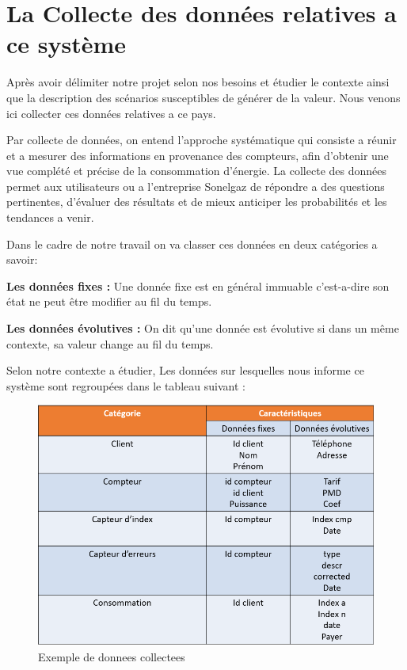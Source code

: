 \section{La Collecte des données relatives a ce système}

Après avoir délimiter notre projet selon nos besoins et étudier le contexte ainsi que la description des scénarios susceptibles de générer de la valeur. Nous venons ici collecter ces données relatives a ce pays.

Par collecte de données, on entend l'approche systématique qui consiste a réunir et a mesurer des informations en provenance des compteurs, afin d'obtenir une vue complété et précise de la consommation d'énergie. La collecte des données permet aux utilisateurs ou a l'entreprise Sonelgaz de répondre a des questions pertinentes, d'évaluer des résultats et de mieux anticiper les probabilités et les tendances a venir. 

Dans le cadre de notre travail on va classer ces données en deux catégories a savoir:

\textbf{Les données fixes :} Une donnée fixe est en général immuable c'est-a-dire son état ne peut être modifier au fil du temps.

\textbf{Les données évolutives :} On dit qu'une donnée est évolutive si dans un même
contexte, sa valeur change au fil du temps.

Selon notre contexte a étudier, Les données sur lesquelles nous informe ce système sont regroupées dans le tableau suivant :

\begin{figure}[h]
	\centering
	\includegraphics[scale=0.8]{img/part2/2.3.png}
	\caption{Exemple de donnees collectees}
\end{figure}
